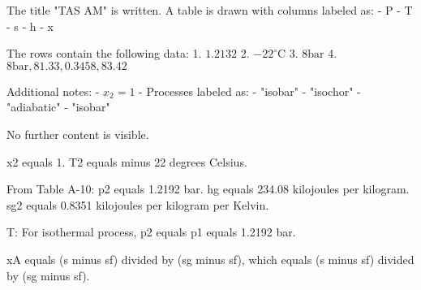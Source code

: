 The title "TAS AM" is written. A table is drawn with columns labeled as:  
- P  
- T  
- s  
- h  
- x  

The rows contain the following data:  
1. \( 1.2132 \)  
2. \( -22^\circ \text{C} \)  
3. \( 8 \text{bar} \)  
4. \( 8 \text{bar}, 81.33, 0.3458, 83.42 \)  

Additional notes:  
- \( x_2 = 1 \)  
- Processes labeled as:  
  - "isobar"  
  - "isochor"  
  - "adiabatic"  
  - "isobar"  

No further content is visible.

x2 equals 1.  
T2 equals minus 22 degrees Celsius.  

From Table A-10:  
p2 equals 1.2192 bar.  
hg equals 234.08 kilojoules per kilogram.  
sg2 equals 0.8351 kilojoules per kilogram per Kelvin.  

T:  
For isothermal process, p2 equals p1 equals 1.2192 bar.  

xA equals (s minus sf) divided by (sg minus sf), which equals (s minus sf) divided by (sg minus sf).